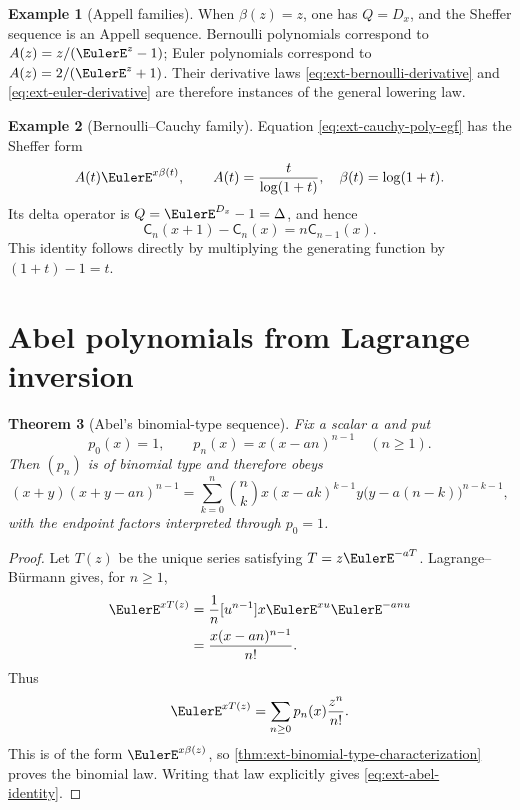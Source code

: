 \documentclass[11pt,a4paper,oneside,openany]{book}
\newtheorem{theorem}{Theorem}[chapter]
\theoremstyle{definition}
\newtheorem{example}[theorem]{Example}
\theoremstyle{remark}
\begin{document}
\begin{example}[Appell families]
When \(\beta(z)=z\), one has \(Q=D_x\), and the Sheffer sequence is an Appell
sequence.  Bernoulli polynomials correspond to
\(A(z)=z/(\EulerE^z-1)\); Euler polynomials correspond to
\(A(z)=2/(\EulerE^z+1)\).  Their derivative laws
\eqref{eq:ext-bernoulli-derivative} and \eqref{eq:ext-euler-derivative} are
therefore instances of the general lowering law.
\end{example}

\begin{example}[Bernoulli--Cauchy family]
Equation \eqref{eq:ext-cauchy-poly-egf} has the Sheffer form
\[
 A(t)\EulerE^{x\beta(t)},\qquad
 A(t)=\frac{t}{\log(1+t)},\quad \beta(t)=\log(1+t).
\]
Its delta operator is \(Q=\EulerE^{D_x}-1=\Delta\), and hence
\begin{equation}\label{eq:ext-cauchy-delta}
 \mathsf C_n(x+1)-\mathsf C_n(x)=n\mathsf C_{n-1}(x).
\end{equation}
This identity follows directly by multiplying the generating function by
\((1+t)-1=t\).
\end{example}

\section{Abel polynomials from Lagrange inversion}

\begin{theorem}[Abel's binomial-type sequence]
Fix a scalar \(a\) and put
\begin{equation}\label{eq:ext-abel-polynomial}
 p_0(x)=1,\qquad p_n(x)=x(x-an)^{n-1}\quad(n\ge1).
\end{equation}
Then \((p_n)\) is of binomial type and therefore obeys
\begin{equation}\label{eq:ext-abel-identity}
 (x+y)(x+y-an)^{n-1}
 =\sum_{k=0}^n\binom nk
 x(x-ak)^{k-1}y\bigl(y-a(n-k)\bigr)^{n-k-1},
\end{equation}
with the endpoint factors interpreted through \(p_0=1\).
\end{theorem}
\begin{proof}
Let \(T(z)\) be the unique series satisfying
\(T=z \EulerE^{-aT}\).  Lagrange--B\"urmann gives, for \(n\ge1\),
\begin{align*}
 [z^n]\EulerE^{xT(z)}
 &=\frac1n[u^{n-1}]x \EulerE^{xu}\EulerE^{-anu}\\
 &=\frac{x(x-an)^{n-1}}{n!}.
\end{align*}
Thus
\[
 \EulerE^{xT(z)}=\sum_{n\ge0}p_n(x)\frac{z^n}{n!}.
\]
This is of the form \(\EulerE^{x\beta(z)}\), so
\cref{thm:ext-binomial-type-characterization} proves the binomial law.
Writing that law explicitly gives \eqref{eq:ext-abel-identity}.
\end{proof}
\end{document}
